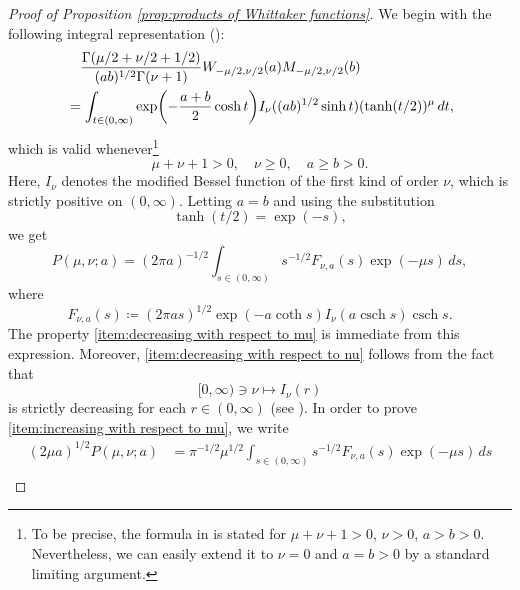 \documentclass[reqno]{amsart}
\theoremstyle{plain}
\numberwithin{equation}{section}
\theoremstyle{remark}
\newcommand{\intervaloo}[2]{(#1, #2)}
\newcommand{\intervalco}[2]{[#1, #2)}
\newcommand{\BesselI}[1]{I_{#1}}
\newcommand{\WhittakerM}[2]{M_{#1, #2}}
\newcommand{\WhittakerW}[2]{W_{#1, #2}}
\DeclareMathOperator{\csch}{csch}
\newcommand{\Productmna}[3]{P(#1,#2;#3)}
\newcommand{\Fnas}[3]{F_{#1, #2}(#3)}
\begin{document}
\begin{proof}[Proof of Proposition \ref{prop:products of Whittaker functions}]
We begin with the following integral representation (\cite[6.669.4]{GR2014}):
\begin{align} \label{eq:products of Whittaker functions integral form}
&\quad \frac{\Gamma(\mu/2 + \nu/2 + 1/2)}{(ab)^{1/2} \Gamma(\nu+1)} \WhittakerW{-\mu/2}{\nu/2}(a) \WhittakerM{-\mu/2}{\nu/2}(b) \\
&= \int_{t \in \intervaloo{0}{\infty}} \exp\mleft(- \frac{a+b}{2} \cosh{t}\mright) \BesselI{\nu}((ab)^{1/2} \sinh{t}) ( \tanh(t/2) )^{\mu} \, dt ,
\end{align}
which is valid whenever\footnote{To be precise, the formula in \citet[6.669.4]{GR2014} is stated for $\mu + \nu + 1 > 0$, $\nu > 0$, $a > b > 0$. 
Nevertheless, we can easily extend it to $\nu = 0$ and $a = b > 0$ by a standard limiting argument.}
\begin{equation}
\mu + \nu + 1 > 0 , \quad \nu \geq 0 , \quad a \geq b > 0 .
\end{equation}
Here, $\BesselI{\nu}$ denotes the modified Bessel function of the first kind of order $\nu$, which is strictly positive on $\intervaloo{0}{\infty}$.
Letting $a = b$ and using the substitution
\begin{equation}
	\tanh(t/2) = \exp(-s) ,
\end{equation}
we get
\begin{equation}
	\Productmna{\mu}{\nu}{a}
	= (2 \pi a)^{-1/2} \int_{s \in \intervaloo{0}{\infty}} s^{-1/2} \Fnas{\nu}{a}{s} \exp(-\mu s)  \, ds ,
\end{equation}
where
\begin{equation}
	\Fnas{\nu}{a}{s} \coloneqq (2 \pi a s)^{1/2} \exp(- a \coth{s}) \BesselI{\nu}(a \csch{s}) \csch{s} .
\end{equation}
The property \ref{item:decreasing with respect to mu} is immediate from this expression.
Moreover, \ref{item:decreasing with respect to nu} follows from the fact that
\begin{equation}
\intervalco{0}{\infty} \ni \nu \longmapsto \BesselI{\nu}(r)
\end{equation}
is strictly decreasing for each $r \in \intervaloo{0}{\infty}$ (see \citet{Coc1967, Reu1968, Jon1968}).
In order to prove \ref{item:increasing with respect to mu}, we write
\begin{align} \label{eq:products of Whittaker functions integral form 2}
	(2 \mu a)^{1/2} \Productmna{\mu}{\nu}{a}
	&= \pi^{-1/2} \mu^{1/2} \int_{s \in \intervaloo{0}{\infty}} s^{-1/2} \Fnas{\nu}{a}{s} \exp(-\mu s)  \, ds \\

\end{align}
\end{proof}
\end{document}
